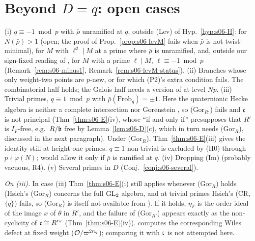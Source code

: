 \section{Beyond \texorpdfstring{$D=q$}{D=q}: open cases}

\begin{remark}\label{rem:s06-open}
(i) $q\equiv-1\bmod p$ with $\bar\rho$ unramified at $q$, outside (Lev) of Hyp.~\ref{hyp:s06-H}: for $N(\bar\rho)>1$ (open; the proof of Prop.~\ref{prop:s06-levM} fails when $\bar\rho$ is not
twist-minimal), for $M$ with $\ell^2\mid M$ at a prime where $\bar\rho$ is unramified, and, outside our sign-fixed reading of \cite[Thm~3.14]{KO},
for $M$ with a prime $\ell\mid M$, $\ell\equiv-1\bmod p$ (Remark~\ref{rem:s06-minus1}, Remark~\ref{rem:s06-levM-status}). (ii) Branches whose only weight-two points are $p$-new, or for which (P2)'s extra condition fails. The
combinatorial half holds; the Galois half needs a version of \cite{KO} at level $Np$. (iii) Trivial primes, $q\equiv1\bmod p$ with
$\bar\rho(\mathrm{Frob}_q)=\pm1$. Here the quaternionic Hecke algebra is neither a complete intersection nor Gorenstein \cite[Intro.,
Thm~1.2]{BKM}
\stcited, so (Gor$_{R'}$) fails and $\mathfrak{c}$ is not principal (Thm~\ref{thm:s06-E}(iv), whose ``if and only if'' presupposes that $R'$ is $I_F$-free, e.g.\ $R/\mathfrak{b}$ free by Lemma~\ref{lem:s06-D}(c), which in turn needs (Gor$_R$), discussed in the next paragraph). Under (Gor$_R$), Thm~\ref{thm:s06-E}(iii) gives the identity
still at height-one primes. $q\equiv1$ non-trivial is excluded by (H0) through $p\nmid\varphi(N)$; \cite{Hs} would allow it only
if $\bar\rho$ is ramified at $q$. (iv) Dropping (Im) (probably vacuous, R4). (v) Several primes in $D$ (Conj.~\ref{conj:s06-several}).
\stopen{}
\end{remark}
\noindent\emph{On (iii).} In case (iii) Thm~\ref{thm:s06-E}(i) still applies whenever (Gor$_R$) holds (Hsieh's (Gor$_R$) concerns the
full $\mathrm{GL}_2$ algebra, and at trivial primes Hsieh's (CR,$\{q\}$) fails, so (Gor$_R$) is itself not available from \cite{Hs}). If it holds,
$\eta_F$ is the order ideal of the image $x$ of $\theta$ in $R'$, and the failure of (Gor$_{R'}$) appears exactly as the non-cyclicity of
$\mathfrak{c}\cong R'^\vee$ (Thm~\ref{thm:s06-E}(iv)). \cite[Thm~1.2]{BKM} computes the corresponding Wiles defect at fixed weight
($\mathcal{O}/\varpi^{2n_q}$); comparing it with $\mathfrak{c}$ is not attempted here. \stopen

